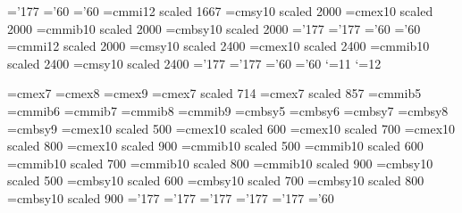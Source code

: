 \skewchar\fourteenmib='177
\skewchar\fourteensy='60
\skewchar\fourteenbsy='60
\font\twentyi=cmmi12 scaled 1667
\font\twentysy=cmsy10 scaled 2000
\font\twentyex=cmex10 scaled 2000
\font\twentymib=cmmib10 scaled 2000
\font\twentybsy=cmbsy10 scaled 2000
\skewchar\twentyi='177
\skewchar\twentymib='177
\skewchar\twentysy='60
\skewchar\twentybsy='60
\font\twentyfouri=cmmi12 scaled 2000
\font\twentyfoursy=cmsy10 scaled 2400
\font\twentyfourex=cmex10 scaled 2400
\font\twentyfourmib=cmmib10 scaled 2400
\font\twentyfourbsy=cmsy10 scaled 2400
\skewchar\twentyfouri='177
\skewchar\twentyfourmib='177
\skewchar\twentyfoursy='60
\skewchar\twentyfourbsy='60
\newdimen\bigsize
\newdimen\Bigsize
\newdimen\biggsize
\newdimen\Biggsize
\catcode`\@=11
\def\big#1{{\hbox{$\left#1\vbox to \bigsize{}\right.\n@space$}}}
\def\Big#1{{\hbox{$\left#1\vbox to \Bigsize{}\right.\n@space$}}}
\def\bigg#1{{\hbox{$\left#1\vbox to \biggsize{}\right.\n@space$}}}
\def\Bigg#1{{\hbox{$\left#1\vbox to \Biggsize{}\right.\n@space$}}}
\ifx\AMSfont\@undefined%
{}
\else
\let\ifAMS=\relax
\fi
\ifx\DStroke\@undefined%
{}
\else
\let\ifDS=\relax
\fi
\ifx\LMTone\@undefined%
{}
\else
\let\ifLMT=\relax
\fi
\ifx\LMTSone\@undefined%
{}
\else
\let\ifLMTS=\relax
\fi
\catcode`\@=12
\ifx\ifAMS\relax%
\immediate{}
\font\sevenex=cmex7
\font\eightex=cmex8
\font\nineex=cmex9
\font\fiveex=cmex7 scaled 714
\font\sixex=cmex7 scaled 857
\font\fivemib=cmmib5
\font\sixmib=cmmib6
\font\sevenmib=cmmib7
\font\eightmib=cmmib8
\font\ninemib=cmmib9
\font\fivebsy=cmbsy5
\font\sixbsy=cmbsy6
\font\sevenbsy=cmbsy7
\font\eightbsy=cmbsy8
\font\ninebsy=cmbsy9
\else
\font\fiveex=cmex10 scaled 500
\font\sixex=cmex10 scaled 600
\font\sevenex=cmex10 scaled 700
\font\eightex=cmex10 scaled 800
\font\nineex=cmex10 scaled 900
\font\fivemib=cmmib10 scaled 500
\font\sixmib=cmmib10 scaled 600
\font\sevenmib=cmmib10 scaled 700
\font\eightmib=cmmib10 scaled 800
\font\ninemib=cmmib10 scaled 900
\font\fivebsy=cmbsy10 scaled 500
\font\sixbsy=cmbsy10 scaled 600
\font\sevenbsy=cmbsy10 scaled 700
\font\eightbsy=cmbsy10 scaled 800
\font\ninebsy=cmbsy10 scaled 900
\fi
\skewchar\fivemib='177
\skewchar\sixmib='177
\skewchar\sevenmib='177
\skewchar\eightmib='177
\skewchar\ninemib='177
\skewchar\fivebsy='60
